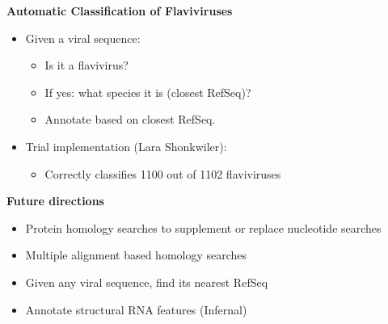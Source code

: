 \documentclass[landscape]{slides}
\begin{document}
\begin{slide}
\begin{center}
\textbf{Automatic Classification of Flaviviruses}

\begin{itemize}
\item Given a viral sequence:
\begin{itemize}
  \item Is it a flavivirus? 
  \item If yes: what species it is (closest RefSeq)? 
  \item Annotate based on closest RefSeq.
\end{itemize}
\end{itemize}

\begin{itemize} 
\item Trial implementation (Lara Shonkwiler): 
\begin{itemize}
  \item Correctly classifies 1100 out of 1102 flaviviruses
\end{itemize}
\end{itemize}



\vfill
\end{center}
\end{slide}
\begin{slide}
\begin{center}
\textbf{Future directions}

\begin{itemize}
\item  Protein homology searches to supplement or replace nucleotide searches
\item  Multiple alignment based homology searches 
\item  Given any viral sequence, find its nearest RefSeq
\item  Annotate structural RNA features (Infernal)
\end{itemize}

\vfill
\end{center}
\end{slide}
\end{document}
